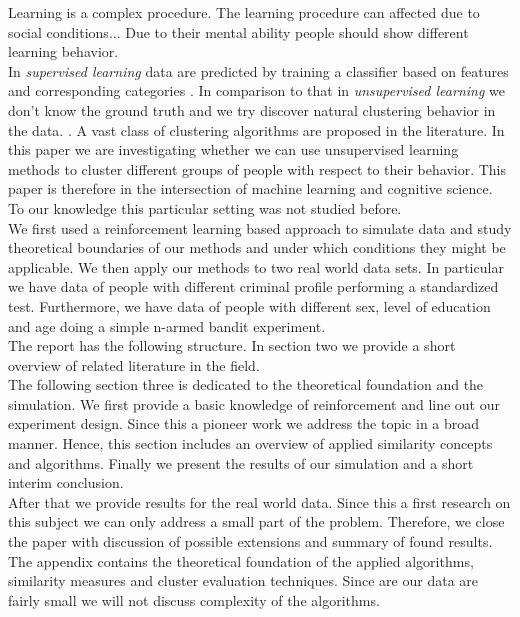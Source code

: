 \documentclass[12pt,a4paper,bibliography=totocnumbered,listof=totocnumbered]{scrartcl}
\begin{document}
Learning is a complex procedure. The learning procedure can affected due to social conditions... Due to their mental ability people should show different learning behavior.\\
In \textit{supervised learning} data are predicted by training a classifier based on features and corresponding categories . In comparison to that in \textit{unsupervised learning} we don't know the ground truth and we try discover natural clustering behavior in the data. \cite[page 9 et. seqq.]{Murphy2012}. A vast class of clustering algorithms are proposed in the literature. 
In this paper we are investigating whether we can use unsupervised learning methods to cluster different groups of people with respect to their behavior. This paper is therefore in the intersection of machine learning and cognitive science. To our knowledge this particular setting was not studied before.\\ 
We first used a reinforcement learning based approach to simulate data and study theoretical boundaries of our methods and under which conditions they might be applicable. We then apply our methods to two real world data sets. In particular we have data of people with different criminal profile performing a standardized test. Furthermore, we have data of people with different sex, level of education and age doing a simple n-armed bandit experiment.\\

The report has the following structure. In section two we provide a short overview of related literature in the field.\\ 
The following section three is dedicated to the theoretical foundation and the simulation. We first provide a basic knowledge of reinforcement and line out our experiment design. Since this a pioneer work we address the topic in a broad manner. Hence, this section includes an overview of applied similarity concepts and algorithms. Finally we  present the results of our simulation and a short interim conclusion.\\ 
After that we provide results for the real world data. Since this a first research on this subject we can only address a small part of the problem. Therefore, we close the paper with discussion of possible extensions and summary of found results. 
The appendix contains the theoretical foundation of the applied algorithms, similarity measures and cluster evaluation techniques. Since are our data are fairly small we will not discuss complexity of the algorithms. 
\end{document}
